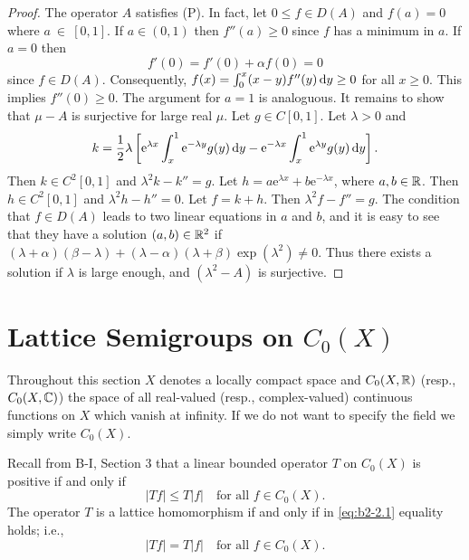 \begin{proof}
The operator $A$ satisfies (P).
In fact, let $0 \leq f \in D(A)$ and $f(a) = 0$ where $a~\in~[0,1]$.
If $a \in (0,1)$ then $f''(a) \geq 0$ since $f$ has a minimum in $a$.
If $a = 0$ then 
\[
f'(0) = f'(0) + \alpha f(0) = 0
\]
since $f \in D(A)$.
Consequently, $f(x) = \int_{0}^{x} (x-y)f''(y) \mathop{}\!\mathrm{d}{y} \geq 0$ for all $x \geq 0$.
This implies $f''(0) \geq 0$.
The argument for $a = 1$ is analoguous.
It remains to show that $\mu - A$ is surjective for large real $\mu$.
Let $g \in C[0,1]$.
Let $\lambda > 0$ and 
\[k = \frac{1}{2}\lambda\left[\mathrm{e}^{\lambda x}\int_{x}^{1} \mathrm{e}^{-\lambda y}g(y)\mathop{}\!\mathrm{d}{y} - \mathrm{e}^{-\lambda x}\int_{x}^{1} \mathrm{e}^{\lambda y}g(y)\mathop{}\!\mathrm{d}{y}\right].
\]
Then $k \in C^{2}[0,1]$ and $\lambda^{2}k - k'' = g$.
Let $h = a\mathrm{e}^{\lambda x} + b\mathrm{e}^{-\lambda x}$, where $a,b \in \mathbb{R}$.
Then $h \in C^{2}[0,1]$ and $\lambda^{2}h - h'' = 0$.
Let $f = k + h$.
Then $\lambda^{2}f - f'' = g$.
The condition that $f \in D(A)$ leads to two linear equations in $a$ and $b$, and it is easy to see that they have a solution $(a,b) \in \mathbb{R}^{2}$ if $(\lambda+\alpha)(\beta-\lambda) + (\lambda-\alpha)(\lambda+\beta)\exp(\lambda^{2}) \neq 0$.
Thus there exists a solution if $\lambda$ is large enough, and $(\lambda^{2} - A)$ is surjective.
\end{proof}

\section{Lattice Semigroups on  \texorpdfstring{$C_{0}(X)$}{C(X)}}\label{sec:b2-2}%
Throughout this section $X$ denotes a locally compact space and $C_{0}(X,\mathbb{R})$ (resp., $C_{0}(X,\mathbb{C})$) the space of all real-valued (resp., complex-valued) continuous functions on $X$ which vanish at infinity.
If we do not want to specify the field we simply write $C_{0}(X)$.

Recall from B-I, Section 3 that a linear bounded operator $T$ on $C_{0}(X)$ is positive if and only if
\begin{equation}\label{eq:b2-2.1}
|Tf| \leq T|f| \quad \text{for all } f \in C_{0}(X).
\end{equation}
The operator $T$ is a lattice homomorphism if and only if in \eqref{eq:b2-2.1} equality holds; i.e.,
\begin{equation}\label{eq:b2-2.2}
|Tf| = T|f| \quad \text{for all } f \in C_{0}(X).
\end{equation}

